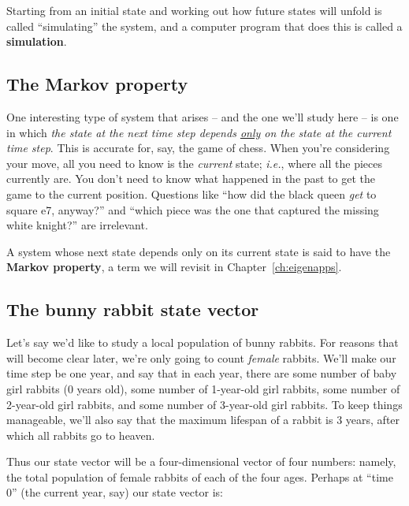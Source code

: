 \begin{alttitles}

Starting from an initial state and working out how future states will unfold is
called ``simulating'' the system, and a computer program that does this is
called a \textbf{simulation}.

\subsection{The Markov property}

One interesting type of system that arises -- and the one we'll study here --
is one in which \textit{the state at the next time step depends
\underline{only} on the state at the current time step}. This is accurate for,
say, the game of chess. When you're considering your move, all you need to know
is the \textit{current} state; \textit{i.e.}, where all the pieces currently
are. You don't need to know what happened in the past to get the game to the
current position. Questions like ``how did the black queen \textit{get} to
square e7, anyway?'' and ``which piece was the one that captured the missing
white knight?'' are irrelevant.


A system whose next state depends only on its current state is said to have the
\textbf{Markov property}, a term we will revisit in Chapter~\ref{ch:eigenapps}.


\subsection{The bunny rabbit state vector}


Let's say we'd like to study a local population of bunny rabbits. For reasons
that will become clear later, we're only going to count \textit{female}
rabbits. We'll make our time step be one year, and say that in each year, there
are some number of baby girl rabbits (0 years old), some number of 1-year-old
girl rabbits, some number of 2-year-old girl rabbits, and some number of
3-year-old girl rabbits. To keep things manageable, we'll also say that the
maximum lifespan of a rabbit is 3 years, after which all rabbits go to heaven.

Thus our state vector will be a four-dimensional vector of four numbers:
namely, the total population of female rabbits of each of the four ages.
Perhaps at ``time 0'' (the current year, say) our state vector is:


\end{alttitles}
